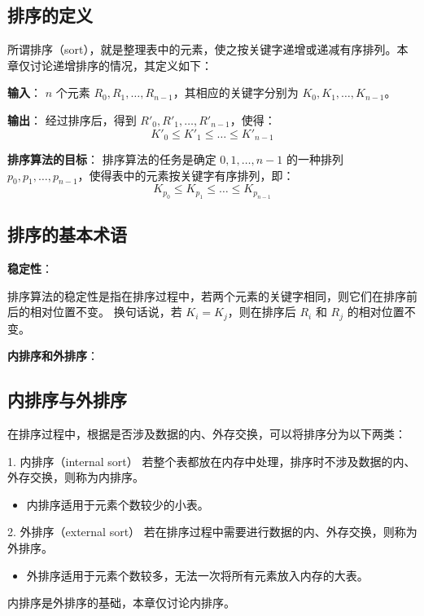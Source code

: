\documentclass[lang=cn,newtx,10pt,scheme=chinese]{../elegantbook}
\begin{document}
 

\subsection{排序的定义}

所谓排序（sort），就是整理表中的元素，使之按关键字递增或递减有序排列。本章仅讨论递增排序的情况，其定义如下：


\textbf{输入}：  
$n$ 个元素 $R_0, R_1, \dots, R_{n-1}$，其相应的关键字分别为 $K_0, K_1, \dots, K_{n-1}$。


\textbf{输出}：  
经过排序后，得到 $R'_0, R'_1, \dots, R'_{n-1}$，使得：
\[
K'_0 \leq K'_1 \leq \dots \leq K'_{n-1}
\]


\textbf{排序算法的目标}：  
排序算法的任务是确定 $0, 1, \dots, n-1$ 的一种排列 $p_0, p_1, \dots, p_{n-1}$，使得表中的元素按关键字有序排列，即：
\[
K_{p_0} \leq K_{p_1} \leq \dots \leq K_{p_{n-1}}
\]

\subsection{排序的基本术语}

\textbf{稳定性}：

排序算法的稳定性是指在排序过程中，若两个元素的关键字相同，则它们在排序前后的相对位置不变。
换句话说，若 $K_i = K_j$，则在排序后 $R_i$ 和 $R_j$ 的相对位置不变。

\textbf{内排序和外排序}：
\subsection{内排序与外排序}

在排序过程中，根据是否涉及数据的内、外存交换，可以将排序分为以下两类：

1. 内排序（internal sort）  
   若整个表都放在内存中处理，排序时不涉及数据的内、外存交换，则称为内排序。  
   \begin{itemize}
     \item 内排序适用于元素个数较少的小表。
   \end{itemize}

2. 外排序（external sort）  
   若在排序过程中需要进行数据的内、外存交换，则称为外排序。  
   \begin{itemize}
     \item 外排序适用于元素个数较多，无法一次将所有元素放入内存的大表。
   \end{itemize}

内排序是外排序的基础，本章仅讨论内排序。
\end{document}
